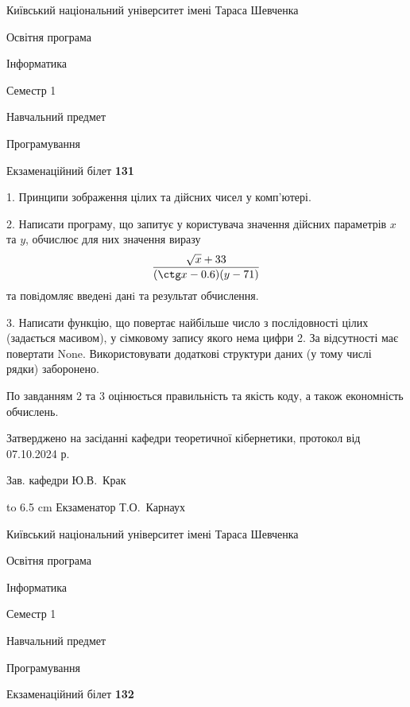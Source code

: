 \documentclass[12pt, ukrainian]{article}
\begin{document}
\vspace{0.9cm}
{{\begin {scriptsize}\par
{ \center  Київський національний університет імені Тараса Шевченка \par}
{\parbox {5 cm}{Освітня програма \hfill}{\parbox {7 cm}{Інформатика\hfill}}\parbox {6 cm}{\hfill Семестр 1}}\par
{\parbox {5 cm} {Навчальний предмет \hfill}\parbox {7 cm}{Програмування \hfill}\parbox {6cm}{\hfill}\par}\vspace{-15pt} \end{scriptsize}}{\center Екзаменаційний білет \No \textbf { 131 }\par}}
{%
1. Принципи зображення цілих та дійсних чисел у комп'ютері.%
\par
2. Написати програму, що запитує у користувача значення дійсних параметрів $x$ та $y$, обчислює для них значення виразу 
$$\frac{\sqrt x + 33}{(\ctg x - 0.6) (y - 71)}$$ 
та повiдомляє введенi данi та результат обчислення.

\par
3. Написати функцію, що повертає найбільше число з послідовності цілих (задається масивом), у сімковому запису якого нема цифри 2. За відсутності має повертати None. Використовувати додаткові структури даних (у тому числі рядки) заборонено.

По завданням 2 та 3 оцінюється правильність та якість коду, а також економність обчислень.

}
{\smallskip\smallskip \begin {scriptsize} Затверджено на засіданні кафедри теоретичної кібернетики, протокол   від   07.10.2024 р.\par\smallskip\smallskip\smallskip\smallskip
{\parbox {6.5 cm} {Зав. кафедри \dotfill Ю.В.~Крак}}\hspace {0.7cm} {\hbox to 6.5 cm { Екзаменатор \dotfill Т.О.~Карнаух}} \end{scriptsize}}
\vspace{0.9cm}
{{\begin {scriptsize}\par
{ \center  Київський національний університет імені Тараса Шевченка \par}
{\parbox {5 cm}{Освітня програма \hfill}{\parbox {7 cm}{Інформатика\hfill}}\parbox {6 cm}{\hfill Семестр 1}}\par
{\parbox {5 cm} {Навчальний предмет \hfill}\parbox {7 cm}{Програмування \hfill}\parbox {6cm}{\hfill}\par}\vspace{-15pt} \end{scriptsize}}{\center Екзаменаційний білет \No \textbf { 132 }\par}}
\end{document}
